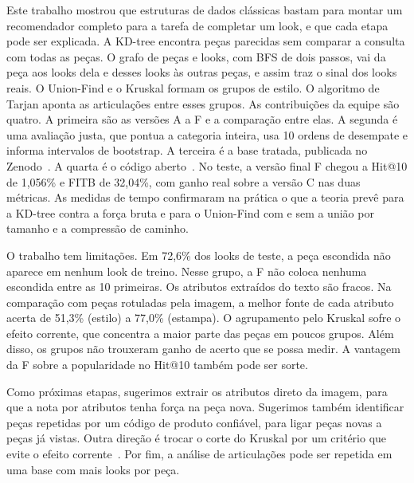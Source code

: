 Este trabalho mostrou que estruturas de dados clássicas bastam para montar um recomendador completo para a tarefa de completar um look, e que cada etapa pode ser explicada. A KD-tree encontra peças parecidas sem comparar a consulta com todas as peças. O grafo de peças e looks, com BFS de dois passos, vai da peça aos looks dela e desses looks às outras peças, e assim traz o sinal dos looks reais. O Union-Find e o Kruskal formam os grupos de estilo. O algoritmo de Tarjan aponta as articulações entre esses grupos. As contribuições da equipe são quatro. A primeira são as versões A a F e a comparação entre elas. A segunda é uma avaliação justa, que pontua a categoria inteira, usa 10 ordens de desempate e informa intervalos de bootstrap. A terceira é a base tratada, publicada no Zenodo~\cite{zenodo}. A quarta é o código aberto~\cite{repositorio}. No teste, a versão final F chegou a Hit@10 de 1,056\% e FITB de 32,04\%, com ganho real sobre a versão C nas duas métricas. As medidas de tempo confirmaram na prática o que a teoria prevê para a KD-tree contra a força bruta e para o Union-Find com e sem a união por tamanho e a compressão de caminho.

O trabalho tem limitações. Em 72,6\% dos looks de teste, a peça escondida não aparece em nenhum look de treino. Nesse grupo, a F não coloca nenhuma escondida entre as 10 primeiras. Os atributos extraídos do texto são fracos. Na comparação com peças rotuladas pela imagem, a melhor fonte de cada atributo acerta de 51,3\% (estilo) a 77,0\% (estampa). O agrupamento pelo Kruskal sofre o efeito corrente, que concentra a maior parte das peças em poucos grupos. Além disso, os grupos não trouxeram ganho de acerto que se possa medir. A vantagem da F sobre a popularidade no Hit@10 também pode ser sorte.

Como próximas etapas, sugerimos extrair os atributos direto da imagem, para que a nota por atributos tenha força na peça nova. Sugerimos também identificar peças repetidas por um código de produto confiável, para ligar peças novas a peças já vistas. Outra direção é trocar o corte do Kruskal por um critério que evite o efeito corrente~\cite{zahn1971}. Por fim, a análise de articulações pode ser repetida em uma base com mais looks por peça.
